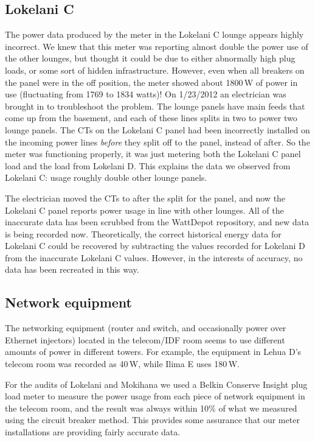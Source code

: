\documentclass[11pt,final]{article}
\newcommand{\W}{\,W\xspace}
\begin{document}
\subsection{Lokelani C}
\label{sec:lokelani-c}
The power data produced by the meter in the Lokelani C lounge appears highly incorrect. We knew that this meter was reporting almost double the power use of the other lounges, but thought it could be due to either abnormally high plug loads, or some sort of hidden infrastructure. However, even when all breakers on the panel were in the off position, the meter showed about 1800\W of power in use (fluctuating from 1769 to 1834 watts)! On 1/23/2012 an electrician was brought in to troubleshoot the problem. The lounge panels have main feeds that come up from the basement, and each of these lines splits in two to power two lounge panels. The CTs on the Lokelani C panel had been incorrectly installed on the incoming power lines \emph{before} they split off to the panel, instead of after. So the meter was functioning properly, it was just metering both the Lokelani C panel load and the load from Lokelani D. This explains the data we observed from Lokelani C: usage roughly double other lounge panels.

The electrician moved the CTs to after the split for the panel, and now the Lokelani C panel reports power usage in line with other lounges. All of the inaccurate data has been scrubbed from the WattDepot repository, and new data is being recorded now. Theoretically, the correct historical energy data for Lokelani C could be recovered by subtracting the values recorded for Lokelani D from the inaccurate Lokelani C values. However, in the interests of accuracy, no data has been recreated in this way.

\subsection{Network equipment}

The networking equipment (router and switch, and occasionally power over Ethernet injectors) located in the telecom/IDF room seems to use different amounts of power in different towers. For example, the equipment in Lehua D's telecom room was recorded as 40\W, while Ilima E uses 180\W.

For the audits of Lokelani and Mokihana we used a Belkin Conserve Insight plug load meter to measure the power usage from each piece of network equipment in the telecom room, and the result was always within 10\% of what we measured using the circuit breaker method. This provides some assurance that our meter installations are providing fairly accurate data.
\end{document}
